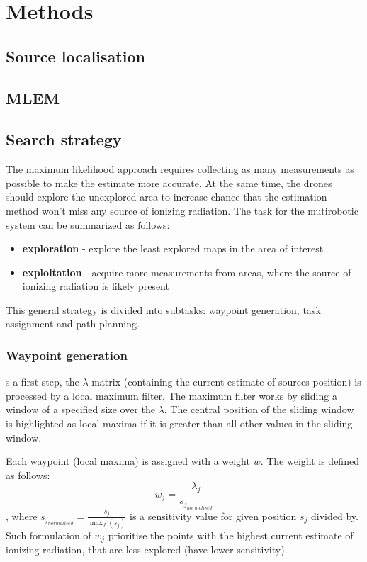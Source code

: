 
\chapter{Methods}



\section{Source localisation}

\section{MLEM}

\section{Search strategy}
The maximum likelihood approach requires collecting as many measurements as possible to make the estimate more accurate.
At the same time, the drones should explore the unexplored area to increase chance that the estimation method won't miss any source of ionizing radiation.
The task for the mutirobotic system can be summarized as follows:
\begin{itemize}
  \item \textbf{exploration} - explore the least explored maps in the area of interest
  \item \textbf{exploitation} - acquire more measurements from areas, where the source of ionizing radiation is likely present
\end{itemize}
 
This general strategy is divided into subtasks: waypoint generation, task assignment and path planning.
\subsection{Waypoint generation}
s a first step, the $\lambda$ matrix (containing the current estimate of sources position) is processed by a local maximum filter. 
The maximum filter works by sliding a window of a specified size over the $\lambda$.
The central position of the sliding window is highlighted as local maxima if it is greater than all other values in the sliding window.

Each waypoint (local maxima) is assigned with a weight $w$.
The weight is defined as follows:
\begin{equation}
  w_{j} = \frac{\lambda_{j}}{s_{j_{normalised}}}
\end{equation},
where $s_{j_{normalised}} = \frac{s_{j}}{\max_{J}( s_{j})}$ is a sensitivity value for given position $s_{j}$ divided by.
Such formulation of $w_{j}$ prioritise the points with the highest current estimate of ionizing radiation, that are less explored (have lower sensitivity).

